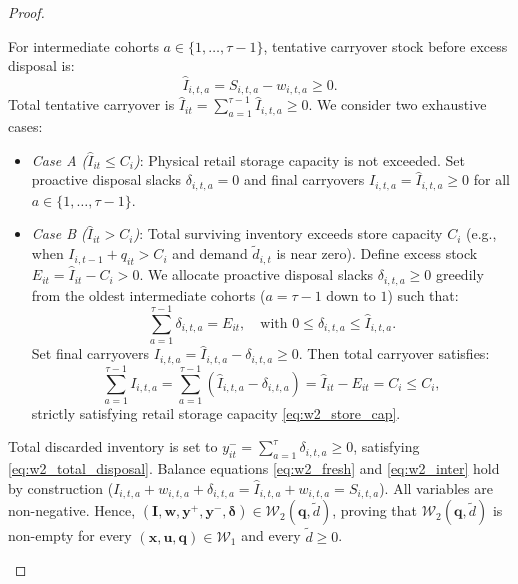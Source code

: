 \documentclass[11pt,a4paper]{article}
\theoremstyle{definition}
\theoremstyle{remark}
\begin{document}
\begin{proof}
\begin{enumerate}[label=\textbf{Part \arabic*.},wide=0pt]
    For intermediate cohorts $a \in \{1, \dots, \tau-1\}$, tentative carryover stock before excess disposal is:
    \begin{equation*}
        \hat{I}_{i,t,a} = S_{i,t,a} - w_{i,t,a} \ge 0.
    \end{equation*}
    Total tentative carryover is $\hat{I}_{it} = \sum_{a=1}^{\tau-1} \hat{I}_{i,t,a} \ge 0$.
    We consider two exhaustive cases:
    \begin{itemize}[leftmargin=*]
        \item \textit{Case A ($\hat{I}_{it} \le C_i$)}: Physical retail storage capacity is not exceeded. Set proactive disposal slacks $\delta_{i,t,a} = 0$ and final carryovers $I_{i,t,a} = \hat{I}_{i,t,a} \ge 0$ for all $a \in \{1, \dots, \tau-1\}$.
        \item \textit{Case B ($\hat{I}_{it} > C_i$)}: Total surviving inventory exceeds store capacity $C_i$ (e.g., when $I_{i,t-1} + q_{it} > C_i$ and demand $\tilde{d}_{i,t}$ is near zero). Define excess stock $E_{it} = \hat{I}_{it} - C_i > 0$. We allocate proactive disposal slacks $\delta_{i,t,a} \ge 0$ greedily from the oldest intermediate cohorts ($a = \tau-1$ down to $1$) such that:
        \begin{equation*}
            \sum_{a=1}^{\tau-1} \delta_{i,t,a} = E_{it}, \quad \text{with } 0 \le \delta_{i,t,a} \le \hat{I}_{i,t,a}.
        \end{equation*}
        Set final carryovers $I_{i,t,a} = \hat{I}_{i,t,a} - \delta_{i,t,a} \ge 0$. Then total carryover satisfies:
        \begin{equation*}
            \sum_{a=1}^{\tau-1} I_{i,t,a} = \sum_{a=1}^{\tau-1} (\hat{I}_{i,t,a} - \delta_{i,t,a}) = \hat{I}_{it} - E_{it} = C_i \le C_i,
        \end{equation*}
        strictly satisfying retail storage capacity \eqref{eq:w2_store_cap}.
    \end{itemize}
    Total discarded inventory is set to $y_{it}^- = \sum_{a=1}^\tau \delta_{i,t,a} \ge 0$, satisfying \eqref{eq:w2_total_disposal}.
    Balance equations \eqref{eq:w2_fresh} and \eqref{eq:w2_inter} hold by construction ($I_{i,t,a} + w_{i,t,a} + \delta_{i,t,a} = \hat{I}_{i,t,a} + w_{i,t,a} = S_{i,t,a}$). All variables are non-negative.
    Hence, $(\mathbf{I}, \mathbf{w}, \mathbf{y}^+, \mathbf{y}^-, \boldsymbol{\delta}) \in \mathcal{W}_2(\mathbf{q}, \tilde{d})$, proving that $\mathcal{W}_2(\mathbf{q}, \tilde{d})$ is non-empty for every $(\mathbf{x}, \mathbf{u}, \mathbf{q}) \in \mathcal{W}_1$ and every $\tilde{d} \ge 0$.


\end{enumerate}
\end{proof}
\end{document}
